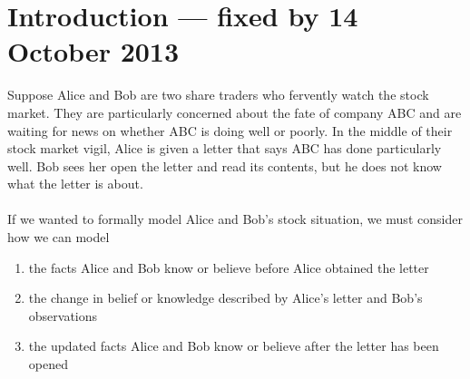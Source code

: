 \section{Introduction --- fixed by 14 October 2013}

% 
% 
% 

Suppose Alice and Bob are two share traders who fervently watch the stock market. They
are particularly concerned about the fate of company ABC and are waiting for news on whether ABC is
doing well or poorly. In the middle of their stock market vigil, Alice is given a letter that says
ABC has done particularly well. Bob sees her open the letter and read its contents, but he does not
know what the letter is about.\\
\\
If we wanted to formally model Alice and Bob's stock situation, we must consider how we can model
\begin{enumerate}
	\item the facts Alice and Bob know or believe before Alice obtained the letter
	\item the change in belief or knowledge described by Alice's letter and Bob's observations
	\item the updated facts Alice and Bob know or believe after the letter has been opened
\end{enumerate}

